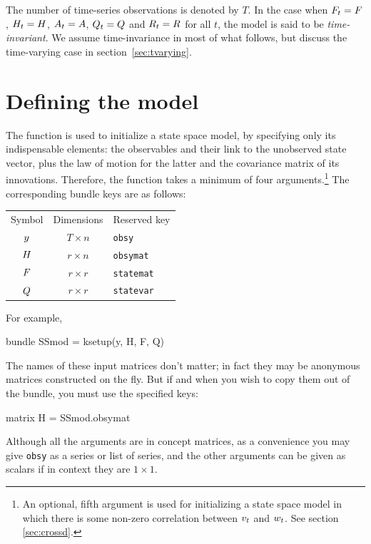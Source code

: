 \documentclass[a4paper]{article}
\begin{document}
The number of time-series observations is denoted by $T$.  In the case
when $F_t = F$, $H_t = H$,
$A_t = A$, $Q_t = Q$ and
$R_t = R$ for all $t$, the model is said to be
\emph{time-invariant}. We assume time-invariance in most of what
follows, but discuss the time-varying case in
section~\ref{sec:tvarying}.

\section{Defining the model}
\label{sec:setup}

The  function is used to initialize a state space
model, by specifying only its indispensable elements: the observables
and their link to the unobserved state vector, plus the law of motion
for the latter and the covariance matrix of its
innovations. Therefore, the function takes a minimum of four
arguments.\footnote{An optional, fifth argument is used for
  initializing a state space model in which there is some non-zero
  correlation between $v_t$ and $w_t$. See section
  \ref{sec:crossd}.} The corresponding bundle keys are as follows:

\begin{center}
\begin{tabular}{ccl}
Symbol & Dimensions & Reserved key \\[6pt]
$y$      & $T \times n$ & \texttt{obsy}\\
$H$      & $r \times n$ & \texttt{obsymat}\\
$F$    & $r \times r$ & \texttt{statemat}\\
$Q$      & $r \times r$ & \texttt{statevar}\\
\end{tabular}
\end{center}

For example,
\begin{code}
bundle SSmod = ksetup(y, H, F, Q)
\end{code} 

The names of these input matrices don't matter; in fact they may be
anonymous matrices constructed on the fly. But if and when you wish to
copy them out of the bundle, you must use the specified keys:
\begin{code}
matrix H = SSmod.obsymat
\end{code}

Although all the arguments are in concept matrices, as a convenience
you may give \texttt{obsy} as a series or list of series, and the
other arguments can be given as scalars if in context they are
$1 \times 1$.
\end{document}
